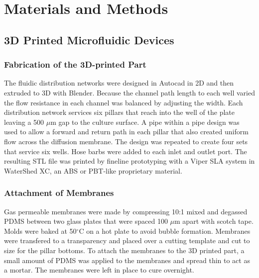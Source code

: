 
\chapter{Materials and Methods} %

\label{Chapter2} %



\section{3D Printed Microfluidic Devices}

\subsection{Fabrication of the 3D-printed Part}
The fluidic distribution networks were designed in Autocad in 2D and then extruded to 3D with Blender.
Because the channel path length to each well varied the flow resistance in each channel was balanced by adjusting the width.
Each distribution network services six pillars that reach into the well of the plate leaving a 500 $\mu$m gap to the culture surface.
A pipe within a pipe design was used to allow a forward and return path in each pillar that also created uniform flow across the diffusion membrane.
The design was repeated to create four sets that service six wells.
Hose barbs were added to each inlet and outlet port.
The resulting STL file was printed by fineline prototyping with a Viper SLA system in WaterShed XC, an ABS or PBT-like proprietary material.

\subsection{Attachment of Membranes}
Gas permeable membranes were made by compressing 10:1 mixed and degassed PDMS between two glass plates that were spaced 100 $\mu$m apart with scotch tape.
Molds were baked at 50$^{\circ}$C on a hot plate to avoid bubble formation.
Membranes were transfered to a transparency and placed over a cutting template and cut to size for the pillar bottoms.
To attach the membranes to the 3D printed part, a small amount of PDMS was applied to the membranes and spread thin to act as a mortar.
The membranes were left in place to cure overnight.

